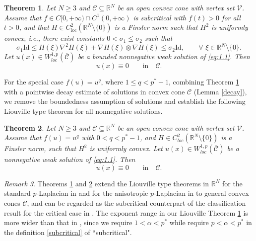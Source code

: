 \documentclass[12pt]{amsart}
\newtheorem{thm}{Theorem}[section]
\theoremstyle{definition}
\theoremstyle{remark}
\newtheorem{rem}[thm]{Remark}
\theoremstyle{conclusion}
\theoremstyle{conjecture}
\numberwithin{equation}{section}
\begin{document}
\begin{thm}\label{Liou}
Let $N\geq3$ and $\mathcal{C}\subseteq\mathbb{R}^{N}$ be an open convex cone with vertex set $\mathcal{V}$. Assume that $f\in C[0,+\infty)\cap C^{1}(0,+\infty)$ is subcritical with $f(t)>0$ for all $t>0$, and that $H\in C^{2}_{\text{loc}}(\mathbb{R}^{N}\setminus\{0\})$ is a Finsler norm such that $H^{2}$ is uniformly convex, i.e., there exist constants $0<\sigma_{1}\leq\sigma_{2}$ such that
\begin{equation}\label{uniformly convex}
\sigma_1 \mathrm{Id}\leq H(\xi)\nabla^2H(\xi)+\nabla H(\xi)\otimes \nabla H(\xi)\leq\sigma_2\mathrm{Id}, \qquad \forall \,\, \xi\in\mathbb{R}^N\setminus\{0\}.
\end{equation}
 Let $u(x)\in W^{1,p}_{loc}(\overline{\mathcal{C}})$ be a bounded nonnegative weak solution
 of \eqref{eq:1.1}. Then
 $$u(x)\equiv 0\qquad\text{in}\quad\mathcal{C}.$$
\end{thm}

For the special case $f(u)=u^q$, where $1\leq q<p^*-1$, combining Theorem \ref{Liou} with a pointwise decay estimate of solutions in convex cone $\mathcal{C}$ (Lemma \ref{decay}), we remove the boundedness assumption of solutions and establish the following Liouville type theorem for all nonnegative solutions.

\begin{thm}\label{liou2}
  Let $N\geq3$ and  $\mathcal{C}\subseteq\mathbb{R}^{N}$ be an open convex cone with vertex set $\mathcal{V}$. Assume that $f(u)=u^{q}$ with $0<q<p^*-1$, and  $H\in C^2_{loc}(\mathbb{R}^N\setminus \{0\})$ is a Finsler norm, such that $H^2$ is uniformly convex. Let $u(x)\in W^{1,p}_{loc}(\overline{\mathcal{C}})$ be a nonnegative weak solution
 of \eqref{eq:1.1}. Then
$$u(x)\equiv 0\qquad\text{in}\quad\mathcal{C}.$$
\end{thm}

\begin{rem}
Theorems \ref{Liou} and \ref{liou2} extend the Liouville type theorems in $\mathbb{R}^{N}$ for the standard $p$-Laplacian in \cite{SZ} and for the anisotropic $p$-Laplacian in \cite{CFV,CHN} to general convex cones $\mathcal{C}$, and can be regarded as the subcritical counterpart of the classification result for the critical case in \cite{CFR}. The exponent range in our Liouville Theorem \ref{Liou} is more wider than that in \cite{CHN}, since we require $1<\alpha<p^*$ while \cite{CHN} require $p<\alpha<p^*$ in the definition \eqref{subcritical} of ``subcritical".
\end{rem}
\end{document}
